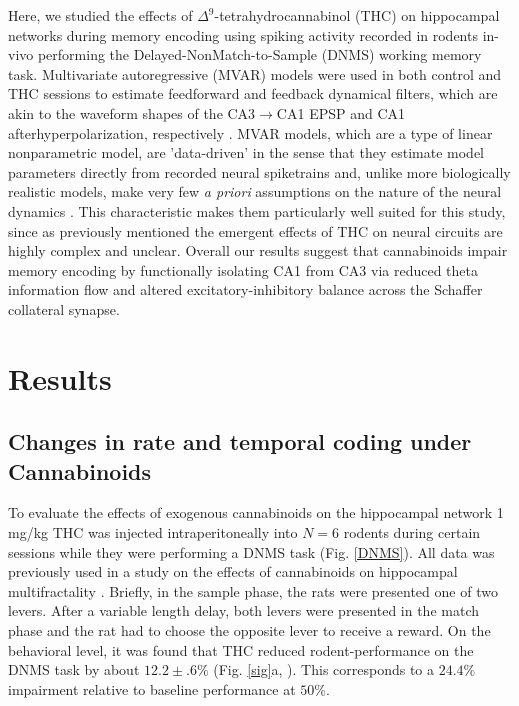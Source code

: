 \documentclass[11pt,a4paper,final]{article}
\begin{document}
Here, we studied the effects of $\Delta^9$-tetrahydrocannabinol (THC) on hippocampal networks during memory encoding using spiking activity recorded in rodents in-vivo performing the Delayed-NonMatch-to-Sample (DNMS) working memory task.
Multivariate autoregressive (MVAR) models were used in both control and THC sessions to estimate feedforward and feedback dynamical filters, which are akin to the waveform shapes of the CA3$\to$CA1 EPSP and CA1 afterhyperpolarization, respectively \citep{sandler14}.
MVAR models, which are a type of linear nonparametric model, are 'data-driven' in the sense that they estimate model parameters directly from recorded neural spiketrains and, unlike more biologically realistic models, make very few \textit{a priori} assumptions on the nature of the neural dynamics \citep{marm04,song09par1}.
This characteristic makes them particularly well suited for this study, since as previously mentioned the emergent effects of THC on neural circuits are highly complex and unclear.
Overall our results suggest that cannabinoids impair memory encoding by functionally isolating CA1 from CA3 via reduced theta information flow and altered excitatory-inhibitory balance across the Schaffer collateral synapse.

\section{Results \label{results}}

    \subsection{Changes in rate and temporal coding under Cannabinoids}

To evaluate the effects of exogenous cannabinoids on the hippocampal network 1 mg/kg THC was injected intraperitoneally into $N=6$ rodents during certain sessions while they were performing a DNMS task (Fig. \ref{DNMS}).
All data was previously used in a study on the effects of cannabinoids on hippocampal multifractality \citep{dustin14,dustin15}.
Briefly, in the sample phase, the rats were presented one of two levers. 
After a variable length delay, both levers were presented in the match phase and the rat had to choose the opposite lever to receive a reward. 
On the behavioral level, it was found that THC reduced rodent-performance on the DNMS task by about $12.2\pm.6\%$ (Fig. \ref{sig}a, \citep{hampson00}).
This corresponds to a $24.4\%$ impairment relative to baseline performance at $50\%$.
\end{document}
